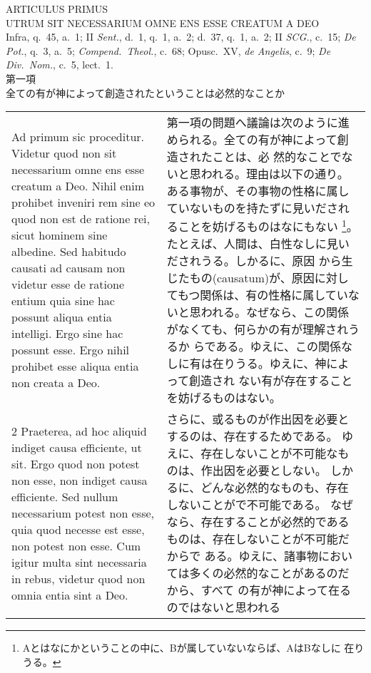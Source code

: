\documentclass[10pt]{jsarticle} %
\begin{document}
\newpage
{}
\begin{center}
{\Large ARTICULUS PRIMUS}\\
{\large UTRUM SIT NECESSARIUM OMNE ENS ESSE CREATUM A DEO}\\
{\footnotesize Infra, q.~45, a.~1; II {\itshape Sent.}, d.~1, q.~1,
 a.~2; d.~37, q.~1, a.~2; II {\itshape SCG.}, c.~15; {\itshape De Pot.},
 q.~3, a.~5; {\itshape Compend.~Theol.}, c.~68; Opusc.~XV, {\itshape de
 Angelis}, c.~9; {\itshape De Div.~Nom.}, c.~5, lect.~1.}\\
{\large 第一項\\全ての有が神によって創造されたということは必然的なことか}
\end{center}
\begin{longtable}{p{21em}p{21em}}

{\sc Ad primum sic proceditur}. Videtur quod non sit necessarium omne ens esse
 creatum a Deo. Nihil enim prohibet inveniri rem sine eo quod non est de
 ratione rei, sicut hominem sine albedine. Sed habitudo causati ad
 causam non videtur esse de ratione entium quia sine hac possunt aliqua
 entia intelligi. Ergo sine hac possunt esse. Ergo nihil prohibet esse
 aliqua entia non creata a Deo.

&

第一項の問題へ議論は次のように進められる。全ての有が神によって創造されたことは、必
 然的なことでないと思われる。理由は以下の通り。ある事物が、その事物の性格に属し
 ていないものを持たずに見いだされることを妨げるものはなにもない
 \footnote{Aとはなにかということの中に、Bが属していないならば、AはBなしに
 在りうる。}。たとえば、人間は、白性なしに見いだされうる。しかるに、原因
 から生じたもの(causatum)が、原因に対してもつ関係は、有の性格に属していな
 いと思われる。なぜなら、この関係がなくても、何らかの有が理解されうるか
 らである。ゆえに、この関係なしに有は在りうる。ゆえに、神によって創造され
 ない有が存在することを妨げるものはない。

\\



2 {\sc Praeterea}, ad hoc aliquid indiget causa efficiente, ut sit. Ergo
 quod non potest non esse, non indiget causa efficiente. Sed nullum
 necessarium potest non esse, quia quod necesse est esse, non potest non
 esse. Cum igitur multa sint necessaria in rebus, videtur quod non omnia
 entia sint a Deo.

&

さらに、或るものが作出因を必要とするのは、存在するためである。
ゆえに、存在しないことが不可能なものは、作出因を必要としない。
しかるに、どんな必然的なものも、存在しないことがで不可能である。
なぜなら、存在することが必然的であるものは、存在しないことが不可能だからで
 ある。ゆえに、諸事物においては多くの必然的なことがあるのだから、すべて
 の有が神によって在るのではないと思われる



\end{longtable}
\end{document}
